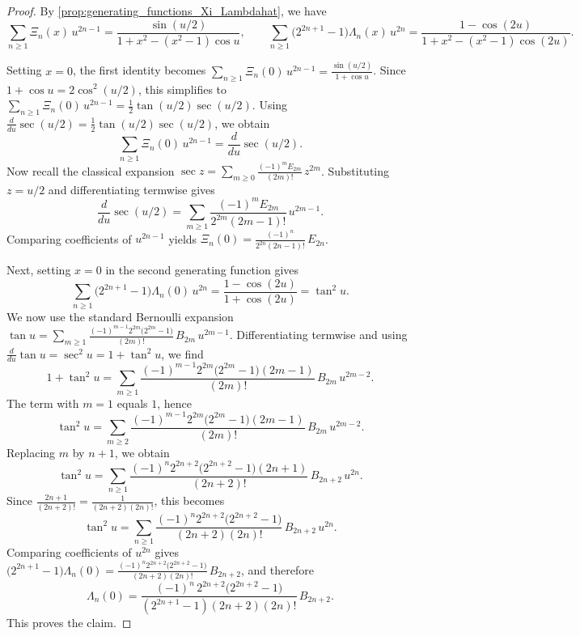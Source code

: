 \documentclass[11pt,twoside]{article}
\numberwithin{equation}{section}
\begin{document}
\begin{proof}
By \cref{prop:generating_functions_Xi_Lambdahat}, we have
\[
\sum_{n\ge1}\Xi_n(x)\,u^{2n-1}
=
\frac{\sin(u/2)}{1+x^2-(x^2-1)\cos u},
\qquad
\sum_{n\ge1}\bigl(2^{2n+1}-1\bigr)\Lambda_n(x)\,u^{2n}
=
\frac{1-\cos(2u)}{1+x^2-(x^2-1)\cos(2u)}.
\]

Setting $\displaystyle x=0$, the first identity becomes $\displaystyle \sum_{n\ge1}\Xi_n(0)\,u^{2n-1}=\frac{\sin(u/2)}{1+\cos u}$. Since $\displaystyle 1+\cos u=2\cos^2(u/2)$, this simplifies to $\displaystyle \sum_{n\ge1}\Xi_n(0)\,u^{2n-1}=\frac12\tan(u/2)\sec(u/2)$. Using $\displaystyle \frac{d}{du}\sec(u/2)=\frac12\tan(u/2)\sec(u/2)$, we obtain
\[
\sum_{n\ge1}\Xi_n(0)\,u^{2n-1}=\frac{d}{du}\sec(u/2).
\]
Now recall the classical expansion $\displaystyle \sec z=\sum_{m\ge0}\frac{(-1)^mE_{2m}}{(2m)!}\,z^{2m}$. Substituting $\displaystyle z=u/2$ and differentiating termwise gives
\[
\frac{d}{du}\sec(u/2)
=
\sum_{m\ge1}\frac{(-1)^mE_{2m}}{2^{2m}(2m-1)!}\,u^{2m-1}.
\]
Comparing coefficients of $\displaystyle u^{2n-1}$ yields $\displaystyle \Xi_n(0)=\frac{(-1)^n}{2^{2n}(2n-1)!}\,E_{2n}$.

Next, setting $\displaystyle x=0$ in the second generating function gives
\[
\sum_{n\ge1}\bigl(2^{2n+1}-1\bigr)\Lambda_n(0)\,u^{2n}
=
\frac{1-\cos(2u)}{1+\cos(2u)}
=
\tan^2u.
\]
We now use the standard Bernoulli expansion $\displaystyle \tan u=\sum_{m\ge1}\frac{(-1)^{m-1}2^{2m}\bigl(2^{2m}-1\bigr)}{(2m)!}\,B_{2m}\,u^{2m-1}$. Differentiating termwise and using $\displaystyle \frac{d}{du}\tan u=\sec^2u=1+\tan^2u$, we find
\[
1+\tan^2u
=
\sum_{m\ge1}\frac{(-1)^{m-1}2^{2m}\bigl(2^{2m}-1\bigr)(2m-1)}{(2m)!}\,B_{2m}\,u^{2m-2}.
\]
The term with $\displaystyle m=1$ equals $\displaystyle 1$, hence
\[
\tan^2u
=
\sum_{m\ge2}\frac{(-1)^{m-1}2^{2m}\bigl(2^{2m}-1\bigr)(2m-1)}{(2m)!}\,B_{2m}\,u^{2m-2}.
\]
Replacing $\displaystyle m$ by $\displaystyle n+1$, we obtain
\[
\tan^2u
=
\sum_{n\ge1}\frac{(-1)^n2^{2n+2}\bigl(2^{2n+2}-1\bigr)(2n+1)}{(2n+2)!}\,B_{2n+2}\,u^{2n}.
\]
Since $\displaystyle \frac{2n+1}{(2n+2)!}=\frac{1}{(2n+2)(2n)!}$, this becomes
\begin{equation}
\tan^2u
=
\sum_{n\ge1}\frac{(-1)^n2^{2n+2}\bigl(2^{2n+2}-1\bigr)}{(2n+2)(2n)!}\,B_{2n+2}\,u^{2n}.
\label{eq:series_of_tan_square}
\end{equation}
Comparing coefficients of $\displaystyle u^{2n}$ gives $\displaystyle \bigl(2^{2n+1}-1\bigr)\Lambda_n(0)=\frac{(-1)^n2^{2n+2}\bigl(2^{2n+2}-1\bigr)}{(2n+2)(2n)!}\,B_{2n+2}$, and therefore
\[
\Lambda_n(0)=
\frac{(-1)^n\,2^{2n+2}\bigl(2^{2n+2}-1\bigr)}{(2^{2n+1}-1)(2n+2)(2n)!}\,B_{2n+2}.
\]
This proves the claim.
\end{proof}
\end{document}
